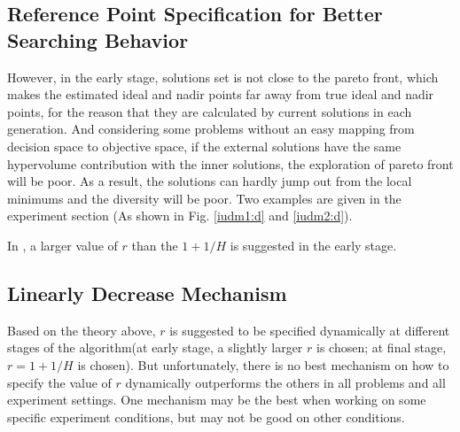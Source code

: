 \documentclass[conference]{IEEEtran}
\begin{document}
%
% 
\subsection{Reference Point Specification for Better Searching Behavior}
However, in the early stage, solutions set is not close to the pareto front, which makes the 
estimated ideal and nadir points far away from true ideal and nadir points, for the reason that
they are calculated by current solutions in each generation. 
And considering some problems without an easy mapping from decision space to objective space,
if the external solutions have the same hypervolume contribution with the inner solutions,
the exploration of pareto front will be poor. 
As a result, the solutions can hardly jump out from the local minimums and the diversity will be poor.
Two examples are given in the experiment section (As shown in Fig. \ref{iudm1:d} and \ref{iudm2:d}). 

In \cite{hisao:dynamic}, a larger value of $r$ than the $1+1/H$ is suggested in the early stage.

% 
\subsection{Linearly Decrease Mechanism}
Based on the theory above, $r$ is suggested to be specified dynamically at different stages of
the algorithm(at early stage, a slightly larger $r$ is chosen; at final stage, $r=1+1/H$ is chosen).
But unfortunately, there is no best mechanism on how to specify the value of $r$ dynamically
outperforms the others in all problems and all experiment settings. One mechanism may be the best
when working on some specific experiment conditions, but may not be good on other conditions. 
\end{document}

